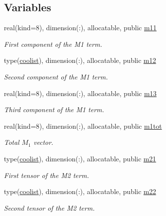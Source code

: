 \subsection*{Variables}
\begin{DoxyCompactItemize}
\item 
real(kind=8), dimension(\+:), allocatable, public \hyperlink{namespacewl__tensor_ac43c10a8ee5e3dd488001634e715b0ae}{m11}
\begin{DoxyCompactList}\small\item\em First component of the M1 term. \end{DoxyCompactList}\item 
type(\hyperlink{structtensor_1_1coolist}{coolist}), dimension(\+:), allocatable, public \hyperlink{namespacewl__tensor_a2c742f8ab1b1994e6a82a04c602d7ca9}{m12}
\begin{DoxyCompactList}\small\item\em Second component of the M1 term. \end{DoxyCompactList}\item 
real(kind=8), dimension(\+:), allocatable, public \hyperlink{namespacewl__tensor_a3fd6e00295fde7edb66a55b18d3baa64}{m13}
\begin{DoxyCompactList}\small\item\em Third component of the M1 term. \end{DoxyCompactList}\item 
real(kind=8), dimension(\+:), allocatable, public \hyperlink{namespacewl__tensor_ac442e2b63d99baccc3cac2abd49c86ca}{m1tot}
\begin{DoxyCompactList}\small\item\em Total $M_1$ vector. \end{DoxyCompactList}\item 
type(\hyperlink{structtensor_1_1coolist}{coolist}), dimension(\+:), allocatable, public \hyperlink{namespacewl__tensor_a58f60ce371ac407b5f7596b8976b52a7}{m21}
\begin{DoxyCompactList}\small\item\em First tensor of the M2 term. \end{DoxyCompactList}\item 
type(\hyperlink{structtensor_1_1coolist}{coolist}), dimension(\+:), allocatable, public \hyperlink{namespacewl__tensor_a952b70ac574c64607a710bd62962d49d}{m22}
\begin{DoxyCompactList}\small\item\em Second tensor of the M2 term. \end{DoxyCompactList}\item 

\end{DoxyCompactItemize}
